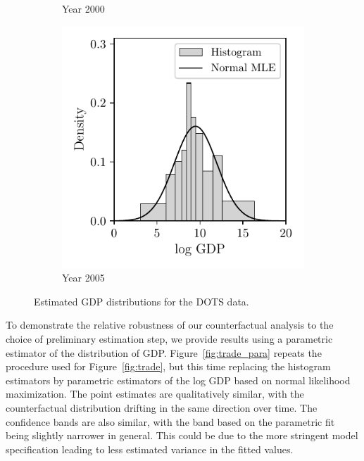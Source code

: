 \begin{figure}[t]
\begin{subfigure}{0.32\textwidth}
    \caption{Year 2000}
  \end{subfigure}
  \begin{subfigure}{0.32\textwidth}
    \centering
    \includegraphics[scale=0.64]{graphics/trade_gdp_2005.pdf}
    \caption{Year 2005}
  \end{subfigure}
  \caption[Estimated GDP distributions for the DOTS data]{
  Estimated GDP distributions for the DOTS data.}
  \label{fig:gdp}
\end{figure}

To demonstrate the relative robustness of our counterfactual analysis to the
choice of preliminary estimation step, we provide results using a
parametric estimator of the distribution of GDP. Figure~\ref{fig:trade_para}
repeats the procedure used for Figure~\ref{fig:trade}, but this time replacing
the histogram estimators by parametric estimators of the log GDP based on
normal likelihood maximization. The point estimates are qualitatively similar,
with the counterfactual distribution drifting in the same direction over time.
The confidence bands are also similar, with the band based on the parametric
fit being slightly narrower in general. This could be due to the more stringent
model specification leading to less estimated variance in the fitted values.

